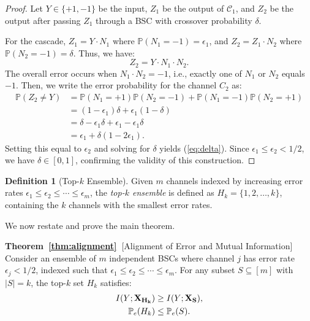 \documentclass{article}
\theoremstyle{plain}
\theoremstyle{definition}
\newtheorem{definition}[theorem]{Definition}
\theoremstyle{remark}
\begin{document}
\begin{proof}
Let $Y \in \{+1, -1\}$ be the input, $Z_1$ be the output of $\mathcal{C}_1$, and $Z_2$ be the output after passing $Z_1$ through a BSC with crossover probability $\delta$. 

For the cascade, $Z_1 = Y \cdot N_1$ where $\mathbb{P}(N_1 = -1) = \epsilon_1$, and $Z_2 = Z_1 \cdot N_2$ where $\mathbb{P}(N_2 = -1) = \delta$. Thus, we have:
\begin{equation}
    Z_2 = Y \cdot N_1 \cdot N_2.
\end{equation}
The overall error occurs when $N_1 \cdot N_2 = -1$, i.e., exactly one of $N_1$ or $N_2$ equals $-1$. Then, we write the error probability for the channel $C_2$ as:
\begin{align}
    \mathbb{P}(Z_2 \neq Y) &= \mathbb{P}(N_1 = +1)\mathbb{P}(N_2 = -1) + \mathbb{P}(N_1 = -1)\mathbb{P}(N_2 = +1) \\
    &= (1 - \epsilon_1)\delta + \epsilon_1(1 - \delta) \\
    &= \delta - \epsilon_1 \delta + \epsilon_1 - \epsilon_1 \delta \\
    &= \epsilon_1 + \delta(1 - 2\epsilon_1).
\end{align}
Setting this equal to $\epsilon_2$ and solving for $\delta$ yields (\ref{eq:delta}). Since $\epsilon_1 \le \epsilon_2 < 1/2$, we have $\delta \in [0,1]$, confirming the validity of this construction.
\end{proof}

\begin{definition}[Top-$k$ Ensemble]
\label{def:topk}
Given $m$ channels indexed by increasing error rates $\epsilon_1 \le \epsilon_2 \le \cdots \le \epsilon_m$, the \emph{top-$k$ ensemble} is defined as $H_k = \{1, 2, \ldots, k\}$, containing the $k$ channels with the smallest error rates.
\end{definition}

We now restate and prove the main theorem.


{\bf Theorem~\ref{thm:alignment}~}[Alignment of Error and Mutual Information]
Consider an ensemble of $m$ independent BSCs where channel $j$ has error rate $\epsilon_j < 1/2$, indexed such that $\epsilon_1 \le \epsilon_2 \le \cdots \le \epsilon_m$. For any subset $S \subseteq [m]$ with $|S| = k$, the top-$k$ set $H_k$ satisfies:
\begin{align}
    I(Y; {\bf X_{H_k}}) &\ge I(Y; {\bf X_S}), \label{eq:alignment_mi_2} \\
    \mathbb{P}_e(H_k) &\le \mathbb{P}_e(S). \label{eq:alignment_pe_2}
\end{align}
\end{document}
